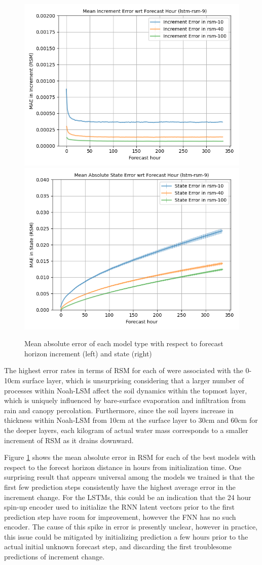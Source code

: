 \begin{figure}[h!]
    \includegraphics[width=.42\linewidth,draft=false]{figures/horizons/eval_best-redo_lstm-rsm-9_rsm_horizon_na_res.png}
    \includegraphics[width=.42\linewidth,draft=false]{figures/horizons/eval_best-redo_lstm-rsm-9_rsm_horizon_na_state.png}


    \caption{Mean absolute error of each model type with respect to forecast horizon increment (left) and state (right)}
    \label{best-horizons}
\end{figure}

The highest error rates in terms of RSM for each of were associated with the 0-10cm surface layer, which is unsurprising considering that a larger number of processes within Noah-LSM affect the soil dynamics within the topmost layer, which is uniquely influenced by bare-surface evaporation and infiltration from rain and canopy percolation. Furthermore, since the soil layers increase in thickness within Noah-LSM from 10cm at the surface layer to 30cm and 60cm for the deeper layers, each kilogram of actual water mass corresponds to a smaller increment of RSM as it drains downward.

Figure \ref{best-horizons} shows the mean absolute error in RSM for each of the best models with respect to the forecst horizon distance in hours from initialization time. One surprising result that appears universal among the models we trained is that the first few prediction steps consistently have the highest average error in the increment change. For the LSTMs, this could be an indication that the 24 hour spin-up encoder used to initialize the RNN latent vectors prior to the first prediction step have room for improvement, however the FNN has no such encoder. The cause of this spike in error is presently unclear, however in practice, this issue could be mitigated by initializing prediction a few hours prior to the actual initial unknown forecast step, and discarding the first troublesome predictions of increment change.

